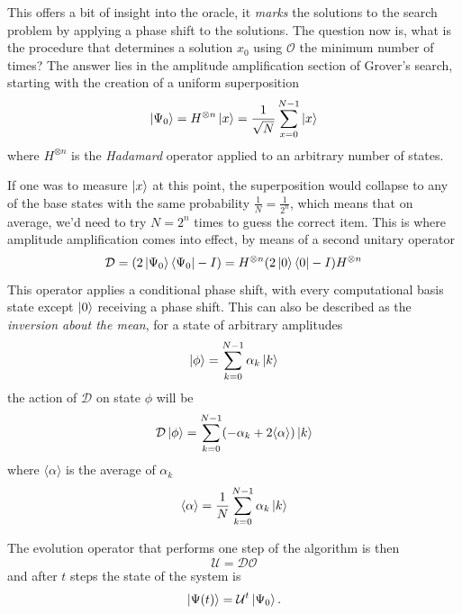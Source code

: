\documentclass[../../dissertation.tex]{subfiles}
\begin{document}
This offers a bit of insight into the oracle, it \textit{marks} the solutions
to the search problem by applying a phase shift to the solutions. 
The question now is, what is the procedure that determines a solution $x_0$
using $\mathcal{O}$ the minimum number of times? The answer lies in the
amplitude amplification section of Grover's search, starting with the creation
of a uniform superposition
\begin{equation}
	\ket{\Psi_0} = H^{\otimes n}\ket{x} = \frac{1}{\sqrt{N}}\sum_{x=0}^{N-1} \ket{x}
\end{equation}
where $H^{\otimes n}$ is the \textit{Hadamard} operator applied to an arbitrary
number of states.\par

If one was to measure $\ket{x}$ at this point, the superposition would collapse
to any of the base states with the same probability $\frac{1}{N} =
\frac{1}{2^n}$, which means that on average, we'd need to try $N = 2^n$ times
to guess the correct item.  This is where amplitude amplification comes into
effect, by means of a second unitary operator
\begin{equation}
	\mathcal{D} = (2\ket{\Psi_0}\bra{\Psi_0} - I) = H^{\otimes n}(2\ket{0}\bra{0} - I)H^{\otimes n}   
\end{equation}
This operator applies a conditional phase shift, with every computational basis
state except $\ket{0}$ receiving a phase shift. This can also be described as
the \textit{inversion about the mean}, for a state of arbitrary amplitudes
\begin{equation}
	\ket{\phi} = \sum_{k=0}^{N-1} \alpha_k\ket{k}
\end{equation}
the action of $\mathcal{D}$ on state $\phi$ will be
\begin{equation}
	\mathcal{D}\ket{\phi} = \sum_{k=0}^{N-1}(-\alpha_k + 2\langle \alpha \rangle)\ket{k}
\end{equation}
where $\langle \alpha \rangle$ is the average of $\alpha_k$
\begin{equation}
	\langle \alpha \rangle = \frac{1}{N} \sum_{k=0}^{N-1} \alpha_k\ket{k}
\end{equation}
\par
The evolution operator that performs one step of the algorithm is then
\begin{equation}
	\mathcal{U} = \mathcal{D}\mathcal{O}
\end{equation}
and after $t$ steps the state of the system is
\begin{equation}
	\ket{\Psi(t)} = \mathcal{U}^t\ket{\Psi_0}.
	\label{eq:groverFinalState}
\end{equation}
\end{document}
